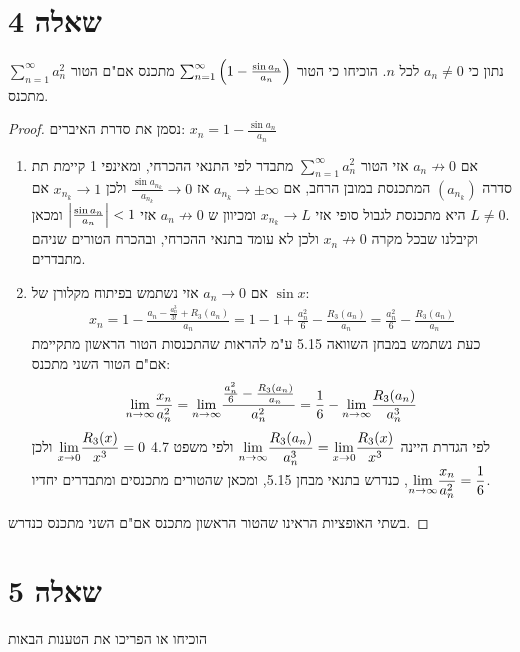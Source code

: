 \documentclass{article}
\begin{document}
		\section*{שאלה 4}
		נתון כי $a_n \neq 0$ לכל $n$.
		הוכיחו כי הטור $\sum_{n=1}^\infty \left( 1 - \frac{\sin a_n}{a_n} \right)$ מתכנס אם"ם הטור $\sum_{n=1}^\infty a_n^2$ מתכנס.
		\begin{proof}
			נסמן את סדרת האיברים: $x_n = 1 - \frac{\sin a_n}{a_n}$
			\begin{enumerate}
				\item אם $a_n \not\to 0$ אזי הטור $\sum_{n=1}^\infty a_n^2$ מתבדר לפי התנאי ההכרחי,
				 ומאינפי 1 קיימת תת סדרה $(a_{n_k})$ המתכנסת במובן הרחב,
				אם $a_{n_k} \to \pm \infty$ אז $\frac{\sin a_{n_k}}{a_{n_k}} \to 0$ ולכן $x_{n_k} \to 1$
				אם היא מתכנסת לגבול סופי אזי $x_{n_k} \to L$ ומכיוון ש $a_n \not\to 0$ אזי $\left| \frac{\sin a_n}{a_n} \right| < 1$ ומכאן $L \neq 0$. \\
				וקיבלנו שבכל מקרה $x_n \not\to 0$ ולכן לא עומד בתנאי ההכרחי, ובהכרח הטורים שניהם מתבדרים.

				\item אם $a_n \to 0$ אזי נשתמש בפיתוח מקלורן של $\sin x$:
				\begin{align*}
					x_n
					= 1 - \frac{a_n - \frac{a_n^3}{3!} + R_3(a_n)}{a_n}
					= 1 - 1 + \frac{a_n^2}{6} - \frac{R_3(a_n)}{a_n}
					= \frac{a_n^2}{6} - \frac{R_3(a_n)}{a_n}
				\end{align*}
				כעת נשתמש במבחן השוואה 5.15 ע"מ להראות שהתכנסות הטור הראשון מתקיימת אם"ם הטור השני מתכנס: \\
				\begin{align*}
					\displaystyle{\lim_{n \to \infty}} \frac{x_n}{a_n^2}
					= \displaystyle{\lim_{n \to \infty}}\frac{\frac{a_n^2}{6} - \frac{R_3(a_n)}{a_n}}{a_n^2}
					= \frac{1}{6} - \displaystyle{\lim_{n \to \infty}} \frac{R_3(a_n)}{a_n^3}
				\end{align*}
				לפי הגדרת היינה $\displaystyle{\lim_{n \to \infty}} \frac{R_3(a_n)}{a_n^3} = \displaystyle{\lim_{x \to 0}} \frac{R_3(x)}{x^3}$
				ולפי משפט 4.7 $\displaystyle{\lim_{x \to 0}} \frac{R_3(x)}{x^3} = 0$
				ולכן $\displaystyle{\lim_{n \to \infty}} \frac{x_n}{a_n^2} = \frac{1}{6}$, כנדרש בתנאי מבחן 5.15, ומכאן שהטורים מתכנסים ומתבדרים יחדיו.
			\end{enumerate}
			בשתי האופציות הראינו שהטור הראשון מתכנס אם"ם השני מתכנס כנדרש.
		\end{proof}

		\pagebreak
		\section*{שאלה 5}
		הוכיחו או הפריכו את הטענות הבאות
\end{document}
